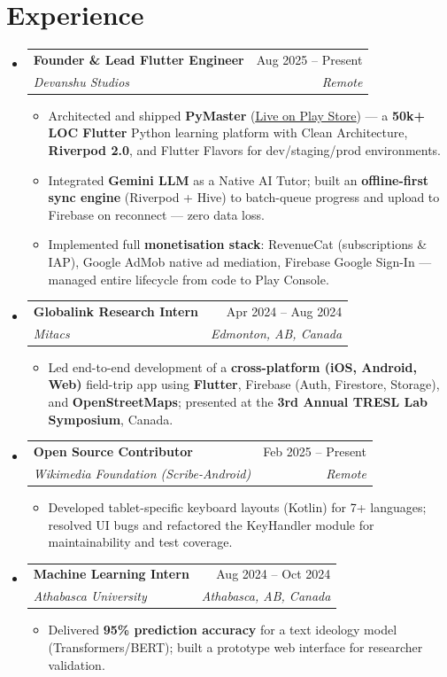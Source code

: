 \documentclass[letterpaper,10pt]{article}
\makeatletter
\newcommand{\resumeItem}[1]{
  \item\small{{#1 \vspace{-2pt}}}
}
\newcommand{\resumeSubheading}[4]{
  \vspace{-1pt}\item
    \begin{tabular*}{0.97\textwidth}[t]{l@{\extracolsep{\fill}}r}
      \textbf{#1} & \small #2 \\
      \textit{\small #3} & \textit{\small #4} \\
    \end{tabular*}\vspace{-6pt}
}
\newcommand{\resumeSubHeadingListStart}{\begin{itemize}[leftmargin=0.13in, label={}]}
\newcommand{\resumeSubHeadingListEnd}{\end{itemize}}
\newcommand{\resumeItemListStart}{\begin{itemize}[leftmargin=0.18in]}
\newcommand{\resumeItemListEnd}{\end{itemize}\vspace{-4pt}}
\makeatother
\begin{document}
\section{Experience}
\resumeSubHeadingListStart

  \resumeSubheading
    {Founder \& Lead Flutter Engineer}{Aug 2025 -- Present}
    {Devanshu Studios}{Remote}
    \resumeItemListStart
      \resumeItem{Architected and shipped \textbf{PyMaster} (\href{https://play.google.com/store/apps/details?id=com.devanshustudios.pymaster}{\underline{Live on Play Store}}) — a \textbf{50k+ LOC Flutter} Python learning platform with Clean Architecture, \textbf{Riverpod 2.0}, and Flutter Flavors for dev/staging/prod environments.}
      \resumeItem{Integrated \textbf{Gemini LLM} as a Native AI Tutor; built an \textbf{offline-first sync engine} (Riverpod + Hive) to batch-queue progress and upload to Firebase on reconnect — zero data loss.}
      \resumeItem{Implemented full \textbf{monetisation stack}: RevenueCat (subscriptions \& IAP), Google AdMob native ad mediation, Firebase Google Sign-In — managed entire lifecycle from code to Play Console.}
    \resumeItemListEnd

  \resumeSubheading
    {Globalink Research Intern}{Apr 2024 -- Aug 2024}
    {Mitacs}{Edmonton, AB, Canada}
    \resumeItemListStart
      \resumeItem{Led end-to-end development of a \textbf{cross-platform (iOS, Android, Web)} field-trip app using \textbf{Flutter}, Firebase (Auth, Firestore, Storage), and \textbf{OpenStreetMaps}; presented at the \textbf{3rd Annual TRESL Lab Symposium}, Canada.}
    \resumeItemListEnd

  \resumeSubheading
    {Open Source Contributor}{Feb 2025 -- Present}
    {Wikimedia Foundation (Scribe-Android)}{Remote}
    \resumeItemListStart
      \resumeItem{Developed tablet-specific keyboard layouts (Kotlin) for 7+ languages; resolved UI bugs and refactored the KeyHandler module for maintainability and test coverage.}
    \resumeItemListEnd

  \resumeSubheading
    {Machine Learning Intern}{Aug 2024 -- Oct 2024}
    {Athabasca University}{Athabasca, AB, Canada}
    \resumeItemListStart
      \resumeItem{Delivered \textbf{95\% prediction accuracy} for a text ideology model (Transformers/BERT); built a prototype web interface for researcher validation.}
    \resumeItemListEnd

\resumeSubHeadingListEnd
\vspace{-2pt}
\end{document}
